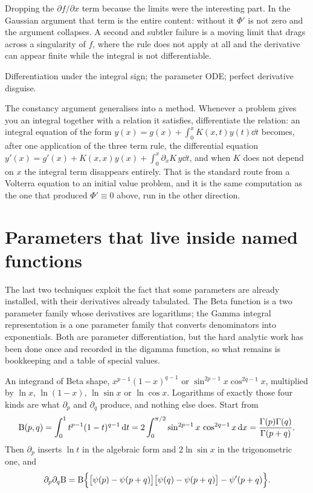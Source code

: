 \begin{trap}
Dropping the $\partial f/\partial x$ term because the limits were the interesting part. In the Gaussian argument that term is the entire content: without it $\Phi'$ is not zero and the argument collapses. A second and subtler failure is a moving limit that drags across a singularity of $f$, where the rule does not apply at all and the derivative can appear finite while the integral is not differentiable.
\end{trap}

\begin{seealsob}Differentiation under the integral sign; the parameter ODE; perfect derivative disguise.\end{seealsob}

The constancy argument generalises into a method. Whenever a problem gives you an integral together with a relation it satisfies, differentiate the relation: an integral equation of the form $y(x)=g(x)+\int_0^{x}K(x,t)y(t)\dd t$ becomes, after one application of the three term rule, the differential equation $y'(x)=g'(x)+K(x,x)y(x)+\int_0^{x}\partial_xK\,y\dd t$, and when $K$ does not depend on $x$ the integral term disappears entirely. That is the standard route from a Volterra equation to an initial value problem, and it is the same computation as the one that produced $\Phi'\equiv0$ above, run in the other direction.

\section{Parameters that live inside named functions}

The last two techniques exploit the fact that some parameters are already installed, with their derivatives already tabulated. The Beta function is a two parameter family whose derivatives are logarithms; the Gamma integral representation is a one parameter family that converts denominators into exponentials. Both are parameter differentiation, but the hard analytic work has been done once and recorded in the digamma function, so what remains is bookkeeping and a table of special values.

\cue An integrand of Beta shape, $x^{p-1}(1-x)^{q-1}$ or $\sin^{2p-1}x\cos^{2q-1}x$, multiplied by $\ln x$, $\ln(1-x)$, $\ln\sin x$ or $\ln\cos x$. Logarithms of exactly those four kinds are what $\partial_p$ and $\partial_q$ produce, and nothing else does.
\method Start from
\[\mathrm{B}(p,q)=\int_0^1t^{p-1}(1-t)^{q-1}\,\mathrm{d} t=2\int_0^{\pi/2}\sin^{2p-1}x\,\cos^{2q-1}x\,\mathrm{d} x=\frac{\Gamma(p)\Gamma(q)}{\Gamma(p+q)}.\]
Then $\partial_p$ inserts $\ln t$ in the algebraic form and $2\ln\sin x$ in the trigonometric one, and
\[\partial_p\partial_q\mathrm{B}=\mathrm{B}\Bigl\{\bigl[\psi(p)-\psi(p+q)\bigr]\bigl[\psi(q)-\psi(p+q)\bigr]-\psi'(p+q)\Bigr\}.\]

